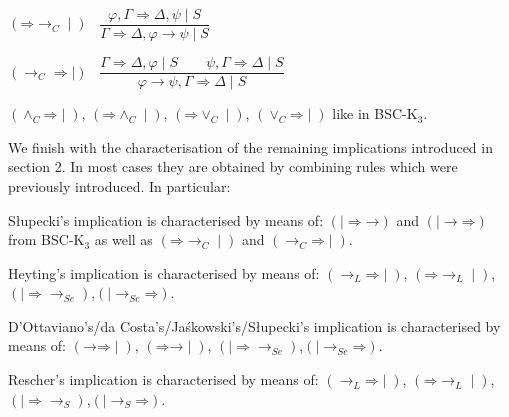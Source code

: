 \documentclass[10pt,a4paper]{article}
\theoremstyle{definition}
\newcommand{\3}{\vspace{.3in}}
\newcommand{\2}{\vspace{.2in}}
\newcommand{\1}{\vspace{.1in}}
\newcommand{\5}{\vspace{.05in}}
\begin{document}
	
\begin{flushleft}
		$(\mathord{\Rightarrow}\mathord{\rightarrow_C\mid})$ \ $\dfrac{\varphi, \Gamma
		\Rightarrow \Delta, \psi \mid S}{\Gamma\Rightarrow\Delta, \varphi\rightarrow\psi \mid S}$
\end{flushleft} 
\begin{flushleft}
		$(\mathord{\rightarrow_C}\mathord{\Rightarrow\mid})$ \ $\dfrac{\Gamma
		\Rightarrow \Delta, \varphi \mid S \qquad\psi,
		\Gamma \Rightarrow \Delta \mid S } {\varphi\rightarrow\psi, \Gamma
		\Rightarrow \Delta \mid S}$
\end{flushleft}

$(\mathord{\wedge_C}\mathord{\Rightarrow}\mid)$,
$(\mathord{\Rightarrow}\mathord{\wedge_C}\mid)$, $(\mathord{\Rightarrow}\mathord{\vee_C}\mid)$,
$(\mathord{\vee_C}\mathord{\Rightarrow}\mid)$ like in BSC-K$_3$. 

\1

We finish with the characterisation of the remaining implications introduced in section 2. In most cases they are obtained by combining rules which were previously introduced. In particular:

S\l upecki's \cite{Slupecki67} implication is characterised by means of:
$(\mathord{\mid\Rightarrow}\mathord{\rightarrow})$ and $(\mathord{\mid \rightarrow}\mathord{\Rightarrow})$ from BSC-K$_3$ as well as $(\mathord{\Rightarrow}\mathord{\rightarrow_C}\mid)$ and $(\mathord{\rightarrow_C}\mathord{\Rightarrow}\mid)$.

Heyting's implication \cite{Heyting} is characterised by means of:
$(\mathord{\rightarrow_L}\mathord{\Rightarrow}\mid)$, $(\mathord{\Rightarrow}\mathord{\rightarrow_L}\mid)$, $(\mathord{\mid\Rightarrow}\mathord{\rightarrow_{Se}})$,$(\mathord{\mid \rightarrow_{Se}}\mathord{\Rightarrow})$.

D'Ottaviano's/da Costa's/Ja\'{s}kowski's/S\l{}upecki's implication \cite{DOttavianodaCosta,Jaskowski48,Slupecki39} is characterised by means of:
$(\mathord{\rightarrow}\mathord{\Rightarrow}\mid)$, $(\mathord{\Rightarrow}\mathord{\rightarrow}\mid)$, $(\mathord{\mid\Rightarrow}\mathord{\rightarrow_{Se}})$,$(\mathord{\mid \rightarrow_{Se}}\mathord{\Rightarrow})$.

Rescher's implication \cite{Rescher} is characterised by means of:
$(\mathord{\rightarrow_L}\mathord{\Rightarrow}\mid)$, $(\mathord{\Rightarrow}\mathord{\rightarrow_L}\mid)$, $(\mathord{\mid\Rightarrow}\mathord{\rightarrow_{S}})$,$(\mathord{\mid \rightarrow_{S}}\mathord{\Rightarrow})$.
\end{document}

